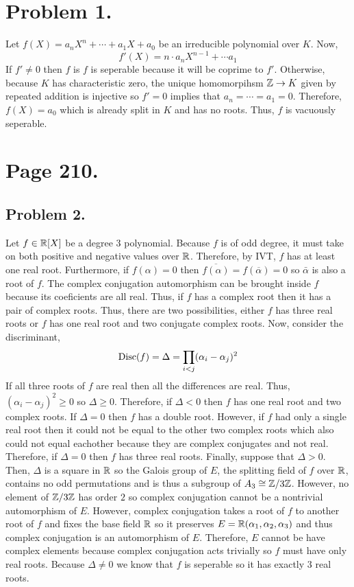 \documentclass[12pt]{extarticle}
\begin{document}

\section*{Problem 1.}

Let $f(X) = a_n X^n + \cdots + a_1 X + a_0$ be an irreducible polynomial over $K$. Now, \[f'(X) = n \cdot a_n X^{n-1} + \cdots a_1\] If $f' \neq 0$ then $f$ is $f$ is seperable because it will be coprime to $f'$. Otherwise, because $K$ has characteristic zero, the unique homomorpihsm $\mathbb{Z} \to K$ given by repeated addition is injective so $f' = 0$ implies that $a_n = \cdots= a_1 = 0$. Therefore, $f(X) = a_0$ which is already split in $K$ and has no roots. Thus, $f$ is vacuously seperable.  

\section*{Page 210.}
\subsection*{Problem 2.}

Let $f \in \mathbb{R}[X]$ be a degree $3$ polynomial. Because $f$ is of odd degree, it must take on both positive and negative values over $\mathbb{R}$. Therefore, by IVT, $f$ has at least one real root. Furthermore, if $f(\alpha) = 0$ then $\overline{f(\alpha)} = f(\overline{\alpha}) = 0$ so $\bar{\alpha}$ is also a root of $f$. The complex conjugation automorphism can be brought inside $f$ because its coeficients are all real. Thus, if $f$ has a complex root then it has a pair of complex roots. Thus, there are two possibilities, either $f$ has three real roots or $f$ has one real root and two conjugate complex roots. Now, consider the discriminant,
\[\mathrm{Disc}(f) = \Delta = \prod\limits_{i < j} (\alpha_i - \alpha_j)^2\]
If all three roots of $f$ are real then all the differences are real. Thus, $(\alpha_i - \alpha_j)^2 \ge 0$ so $\Delta \ge 0$. Therefore, if $\Delta < 0$ then $f$ has one real root and two complex roots. If $\Delta = 0$ then $f$ has a double root. However, if $f$ had only a single real root then it could not be equal to the other two complex roots which also could not equal eachother because they are complex conjugates and not real. Therefore, if $\Delta = 0$ then $f$ has three real roots. Finally, suppose that $\Delta > 0$. Then, $\Delta$ is a square in $\mathbb{R}$ so the Galois group of $E$, the splitting field of $f$ over $\mathbb{R}$, contains no odd permutations and is thus a subgroup of $A_3 \cong \mathbb{Z}/3\mathbb{Z}$. However, no element of $\mathbb{Z}/3\mathbb{Z}$ has order $2$ so complex conjugation cannot be a nontrivial automorphism of $E$. However, complex conjugation takes a root of $f$ to another root of $f$ and fixes the base field $\mathbb{R}$ so it preserves $E = \mathbb{R}(\alpha_1, \alpha_2, \alpha_3)$ and thus complex conjugation is an automorphism of $E$. Therefore, $E$ cannot be have complex elements because complex conjugation acts trivially so $f$ must have only real roots. Because $\Delta \neq 0$ we know that $f$ is seperable so it has exactly 3 real roots.  
\end{document}
